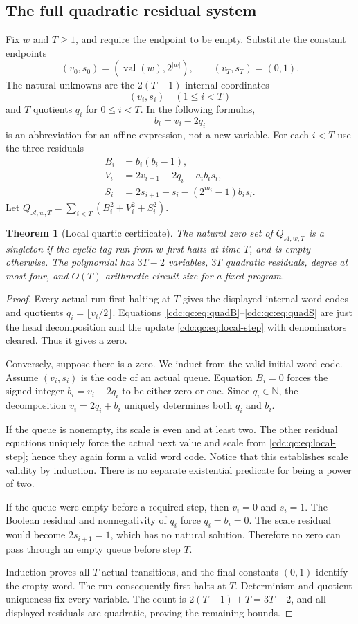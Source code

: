 \documentclass[11pt,a4paper]{article}
\newtheorem{theorem}{Theorem}[section]
\theoremstyle{definition}
\theoremstyle{remark}
\newcommand{\N}{\mathbb N}
\newcommand{\val}{\operatorname{val}}
\newcommand{\CT}{\mathcal A}
\begin{document}
\subsection{The full quadratic residual system}
Fix $w$ and $T\geq1$, and require the endpoint to be empty. Substitute the constant endpoints
\[
 (v_0,s_0)=(\val(w),2^{|w|}),\qquad (v_T,s_T)=(0,1).
\]
The natural unknowns are the $2(T-1)$ internal coordinates
\[
 (v_i,s_i)\quad(1\leq i<T)
\]
and $T$ quotients $q_i$ for $0\leq i<T$. In the following formulas,
\[
 b_i=v_i-2q_i
\]
is an abbreviation for an affine expression, not a new variable. For each $i<T$ use the three residuals
\begin{align}
 B_i&=b_i(b_i-1),\label{cdc:qc:eq:quadB}\\
 V_i&=2v_{i+1}-2q_i-a_i b_i s_i,\label{cdc:qc:eq:quadV}\\
 S_i&=2s_{i+1}-s_i-(2^{m_i}-1)b_i s_i.\label{cdc:qc:eq:quadS}
\end{align}
Let $Q_{\CT,w,T}=\sum_{i<T}(B_i^2+V_i^2+S_i^2)$.

\begin{theorem}[Local quartic certificate]\label{cdc:qc:thm:quartic}
The natural zero set of $Q_{\CT,w,T}$ is a singleton if the cyclic-tag run from $w$ first halts at time $T$, and is empty otherwise. The polynomial has $3T-2$ variables, $3T$ quadratic residuals, degree at most four, and $O(T)$ arithmetic-circuit size for a fixed program.
\end{theorem}
\begin{proof}
Every actual run first halting at $T$ gives the displayed internal word codes and quotients $q_i=\lfloor v_i/2\rfloor$. Equations~\eqref{cdc:qc:eq:quadB}--\eqref{cdc:qc:eq:quadS} are just the head decomposition and the update \eqref{cdc:qc:eq:local-step} with denominators cleared. Thus it gives a zero.

Conversely, suppose there is a zero. We induct from the valid initial word code. Assume $(v_i,s_i)$ is the code of an actual queue. Equation $B_i=0$ forces the signed integer $b_i=v_i-2q_i$ to be either zero or one. Since $q_i\in\N$, the decomposition $v_i=2q_i+b_i$ uniquely determines both $q_i$ and $b_i$.

If the queue is nonempty, its scale is even and at least two. The other residual equations uniquely force the actual next value and scale from \eqref{cdc:qc:eq:local-step}; hence they again form a valid word code. Notice that this establishes scale validity by induction. There is no separate existential predicate for being a power of two.

If the queue were empty before a required step, then $v_i=0$ and $s_i=1$. The Boolean residual and nonnegativity of $q_i$ force $q_i=b_i=0$. The scale residual would become $2s_{i+1}=1$, which has no natural solution. Therefore no zero can pass through an empty queue before step $T$.

Induction proves all $T$ actual transitions, and the final constants $(0,1)$ identify the empty word. The run consequently first halts at $T$. Determinism and quotient uniqueness fix every variable. The count is $2(T-1)+T=3T-2$, and all displayed residuals are quadratic, proving the remaining bounds.
\end{proof}
\end{document}
